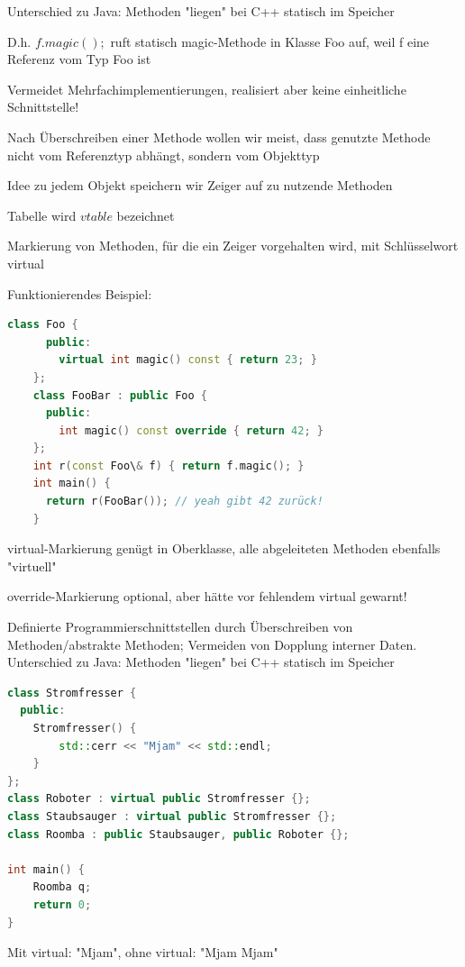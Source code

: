 \documentclass[10pt]{article}
\begin{document}
\begin{itemize*}
  \item Unterschied zu Java: Methoden "liegen" bei C++ statisch im Speicher
  \begin{itemize*}
    \item D.h. $f.magic();$ ruft statisch magic-Methode in Klasse Foo auf, weil f eine Referenz vom Typ Foo ist
    \item Vermeidet Mehrfachimplementierungen, realisiert aber keine einheitliche Schnittstelle!
  \end{itemize*}
  \item Nach Überschreiben einer Methode wollen wir meist, dass genutzte Methode nicht vom Referenztyp abhängt, sondern vom Objekttyp
  \begin{itemize*}
    \item Idee zu jedem Objekt speichern wir Zeiger auf zu nutzende Methoden
    \item Tabelle wird $vtable$ bezeichnet
    \item Markierung von Methoden, für die ein Zeiger vorgehalten wird, mit Schlüsselwort virtual
    \item Funktionierendes Beispiel:
    \begin{lstlisting}[language=C++]
    class Foo {
      public:
        virtual int magic() const { return 23; }
    };
    class FooBar : public Foo {
      public:
        int magic() const override { return 42; }
    };
    int r(const Foo\& f) { return f.magic(); }
    int main() {
      return r(FooBar()); // yeah gibt 42 zurück!
    }
    \end{lstlisting}
    \item virtual-Markierung genügt in Oberklasse, alle abgeleiteten Methoden ebenfalls "virtuell"
    \item override-Markierung optional, aber hätte vor fehlendem virtual gewarnt!
  \end{itemize*}
\end{itemize*}

Definierte Programmierschnittstellen durch Überschreiben von Methoden/abstrakte Methoden; Vermeiden von Dopplung interner Daten.
Unterschied zu Java: Methoden "liegen" bei C++ statisch im Speicher

\begin{lstlisting}[language=C++]
class Stromfresser {
  public:
    Stromfresser() {
        std::cerr << "Mjam" << std::endl;
    }
};
class Roboter : virtual public Stromfresser {};
class Staubsauger : virtual public Stromfresser {};
class Roomba : public Staubsauger, public Roboter {};

int main() {
    Roomba q;
    return 0;
}
\end{lstlisting}
Mit virtual: "Mjam", ohne virtual: "Mjam Mjam"
\end{document}
